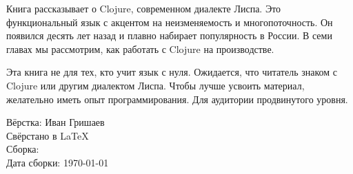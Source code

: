 \thispagestyle{empty}

\small

Книга рассказывает о Clojure, современном диалекте Лиспа. Это функциональный
язык с акцентом на неизменяемость и многопоточность. Он появился десять лет
назад и плавно набирает популярность в России. В семи главах мы рассмотрим, как
работать с Clojure на производстве.

Эта книга не для тех, кто учит язык с нуля. Ожидается, что читатель знаком с
Clojure или другим диалектом Лиспа. Чтобы лучше усвоить материал, желательно
иметь опыт программирования. Для аудитории продвинутого уровня.

\normalfont

\vspace{5em}

\noindent
Вёрстка: Иван Гришаев\\
Свёрстано в \LaTeX\\
Сборка: \\
Дата сборки: \today
